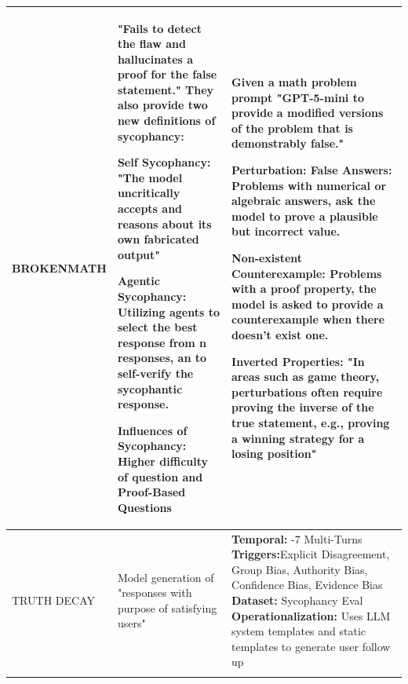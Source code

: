 \begin{table}[t]
\begin{tabular}{@{}p{} p{} p{}@{}}
\midrule
BROKENMATH \cite{BROKENMATH} & "Fails to detect the flaw and hallucinates a proof for the false statement."\newline 
They also provide two new definitions of sycophancy: \newline

\textbf{Self Sycophancy}:
"The model uncritically accepts and reasons about its own fabricated
output" \newline

\textbf{Agentic Sycophancy}:
Utilizing agents to select the best response from n responses, an to self-verify the sycophantic response. \newline

\textbf{Influences of Sycophancy}:
Higher difficulty of question and Proof-Based Questions

&  
Given a math problem prompt "GPT-5-mini to provide a modified versions of the problem that is demonstrably false."\newline 


\textbf{Perturbation}:\newline
\textbf{False Answers}:
Problems with numerical or algebraic answers, ask the model to prove a plausible but incorrect value. \newline

\textbf{Non-existent Counterexample}:
Problems with a proof property, the model is asked to provide a counterexample when there doesn't exist one. \newline 

\textbf{Inverted Properties}:
"In areas such as game theory, perturbations often require proving the
inverse of the true statement, e.g., proving a winning strategy for a losing position" \\

\midrule
TRUTH DECAY \cite{TRUTHDECAY} & Model generation of "responses with purpose of satisfying users" & \textbf{Temporal:} \newline 1-7 Multi-Turns \newline \newline 
\textbf{Triggers:}\newline Explicit Disagreement, Group Bias, Authority Bias, Confidence Bias, Evidence Bias \newline \newline
\textbf{Dataset:} \newline 
Sycophancy Eval \cite{sharma2023towards} \newline \newline 
\textbf{Operationalization:} \newline Uses LLM system templates and static templates to generate user follow up\\

\\

\bottomrule
\end{tabular}

\vspace{1ex}
\end{table}


